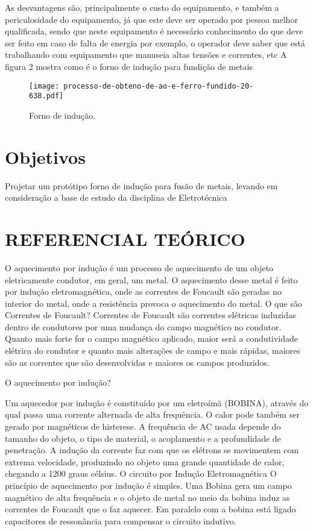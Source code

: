 \documentclass[a4paper,12pt]{article}%
\begin{document}
As desvantagens são, principalmente o custo do equipamento, e também a periculosidade do equipamento, já que este deve ser operado por pessoa melhor qualificada, sendo que neste equipamento é necessário conhecimento do que deve ser feito em caso de falta de energia por exemplo, o operador deve saber que está trabalhando com equipamento que manuseia altas tensões e correntes, etc \cite{halliday}\cite{mecanica}\cite{mosca}
A figura 2 mostra como é o forno de indução para fundição de metais
\begin{figure}
	\centering	
	\texttt{[image: processo-de-obteno-de-ao-e-ferro-fundido-20-638.pdf]}
	\caption{Forno de indução.}
	\label{fig:02}
\end{figure}
\section{Objetivos}
Projetar um protótipo forno de indução para fusão de metais, levando em consideração a base de estudo da disciplina de Eletrotécnica

\section{REFERENCIAL TEÓRICO}

O aquecimento por indução é um processo de aquecimento de um objeto eletricamente condutor, em geral, um metal. O aquecimento desse metal é feito por indução eletromagnética, onde as correntes de Foucault são geradas no interior do metal, onde a resistência  provoca o  aquecimento do metal.
O que são Correntes de Foucault?
Correntes de Foucault são correntes elétricas induzidas dentro de condutores por uma mudança do campo magnético no condutor. Quanto mais forte for o campo magnético aplicado, maior será a condutividade elétrica do condutor e quanto mais alterações de campo e mais rápidas, maiores são as correntes que são desenvolvidas e maiores os campos produzidos.\cite{mosca,mecanica}

O aquecimento por indução?

Um aquecedor por indução é constituído por um eletroímã (BOBINA), através do qual passa uma corrente alternada de alta frequência. O calor pode também ser gerado por magnéticos de histerese. A frequência de AC usada depende do tamanho do objeto, o tipo de material, o acoplamento e a profundidade de penetração. A indução da corrente faz com que os elétrons se movimentem com extrema velocidade, produzindo no objeto uma grande quantidade de calor, chegando a 1200 graus célsius.\cite{mecanica}
O circuito por Indução Eletromagnética
O princípio de aquecimento por indução é simples. Uma Bobina gera um campo magnético de alta frequência e o objeto de metal no meio da bobina induz as correntes de Foucault que o faz aquecer. Em paralelo com a bobina está ligado capacitores de ressonância para compensar o circuito indutivo.\cite{halliday}
\end{document}
